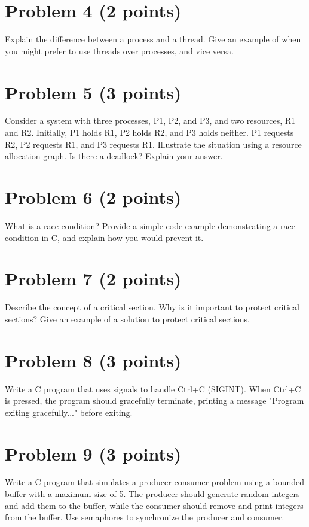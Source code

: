 \documentclass{article}
\begin{document}
\section*{Problem 4 (2 points)}

Explain the difference between a process and a thread.  Give an example of when you might prefer to use threads over processes, and vice versa.


\section*{Problem 5 (3 points)}

Consider a system with three processes, P1, P2, and P3, and two resources, R1 and R2.  Initially, P1 holds R1, P2 holds R2, and P3 holds neither.  P1 requests R2, P2 requests R1, and P3 requests R1.  Illustrate the situation using a resource allocation graph.  Is there a deadlock?  Explain your answer.


\section*{Problem 6 (2 points)}

What is a race condition? Provide a simple code example demonstrating a race condition in C, and explain how you would prevent it.


\section*{Problem 7 (2 points)}

Describe the concept of a critical section.  Why is it important to protect critical sections?  Give an example of a solution to protect critical sections.


\section*{Problem 8 (3 points)}

Write a C program that uses signals to handle Ctrl+C (SIGINT). When Ctrl+C is pressed, the program should gracefully terminate, printing a message "Program exiting gracefully..." before exiting.


\section*{Problem 9 (3 points)}

Write a C program that simulates a producer-consumer problem using a bounded buffer with a maximum size of 5. The producer should generate random integers and add them to the buffer, while the consumer should remove and print integers from the buffer. Use semaphores to synchronize the producer and consumer.
\end{document}

